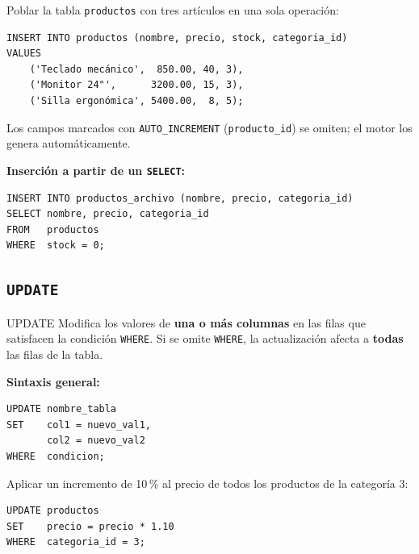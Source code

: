\begin{ejemplo}
  Poblar la tabla \texttt{productos} con tres artículos en una sola operación:

\begin{lstlisting}[style=sql, caption={Inserción múltiple en la tabla productos}]
INSERT INTO productos (nombre, precio, stock, categoria_id)
VALUES
    ('Teclado mecánico',  850.00, 40, 3),
    ('Monitor 24"',      3200.00, 15, 3),
    ('Silla ergonómica', 5400.00,  8, 5);
\end{lstlisting}

  Los campos marcados con \texttt{AUTO\_INCREMENT} (\texttt{producto\_id}) se
  omiten; el motor los genera automáticamente.
\end{ejemplo}

\textbf{Inserción a partir de un \texttt{SELECT}:}

\begin{lstlisting}[style=sql, caption={INSERT ... SELECT: copiar filas desde otra tabla}]
INSERT INTO productos_archivo (nombre, precio, categoria_id)
SELECT nombre, precio, categoria_id
FROM   productos
WHERE  stock = 0;
\end{lstlisting}

\subsection{\texttt{UPDATE}}

\begin{definicion}{UPDATE}
  Modifica los valores de \textbf{una o más columnas} en las filas que satisfacen
  la condición \texttt{WHERE}. Si se omite \texttt{WHERE}, la actualización afecta
  a \textbf{todas} las filas de la tabla.
\end{definicion}

\textbf{Sintaxis general:}

\begin{lstlisting}[style=sql, caption={Sintaxis de UPDATE con WHERE}]
UPDATE nombre_tabla
SET    col1 = nuevo_val1,
       col2 = nuevo_val2
WHERE  condicion;
\end{lstlisting}

\begin{ejemplo}
  Aplicar un incremento de 10\,\% al precio de todos los productos de la
  categoría 3:

\begin{lstlisting}[style=sql, caption={UPDATE con expresión aritmética}]
UPDATE productos
SET    precio = precio * 1.10
WHERE  categoria_id = 3;
\end{lstlisting}
\end{ejemplo}

